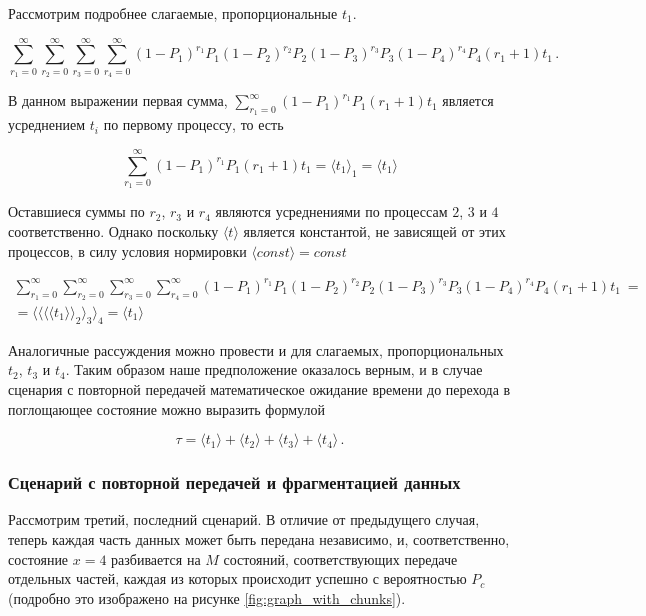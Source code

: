 \documentclass[12pt]{article}
\theoremstyle{definition}
\begin{document}
Рассмотрим подробнее слагаемые, пропорциональные $t_1$.

\begin{equation}
\sum_{r_1=0}^\infty\sum_{r_2=0}^\infty\sum_{r_3=0}^\infty\sum_{r_4=0}^\infty (1-P_1)^{r_1}P_1 (1-P_2)^{r_2}P_2 (1-P_3)^{r_3}P_3 (1-P_4)^{r_4}P_4 (r_1+1)t_1\,.
\end{equation}

В данном выражении первая сумма, $\sum_{r_1=0}^\infty (1-P_1)^{r_1}P_1 (r_1+1)t_1$ является усреднением $t_i$ по первому процессу, то есть 

\begin{equation}
    \sum_{r_1=0}^\infty (1-P_1)^{r_1}P_1 (r_1+1)t_1 = \langle t_1 \rangle_1 = \langle t_1 \rangle
\end{equation}

Оставшиеся суммы по $r_2$, $r_3$ и $r_4$ являются усреднениями по процессам $2$, $3$ и $4$ соответственно. Однако поскольку $\langle t\rangle$ является константой, не зависящей от этих процессов, в силу условия нормировки $\langle const\rangle = const$

\begin{multline}
\sum_{r_1=0}^\infty\sum_{r_2=0}^\infty\sum_{r_3=0}^\infty\sum_{r_4=0}^\infty (1-P_1)^{r_1}P_1 (1-P_2)^{r_2}P_2 (1-P_3)^{r_3}P_3 (1-P_4)^{r_4}P_4 (r_1+1)t_1\ = \\
= \langle\langle\langle\langle t_1 \rangle\rangle_2\rangle_3\rangle_4 = \langle t_1 \rangle
\end{multline}

Аналогичные рассуждения можно провести и для слагаемых, пропорциональных $t_2$, $t_3$ и $t_4$. Таким образом наше предположение оказалось верным, и в случае сценария с повторной передачей математическое ожидание времени до перехода в поглощающее состояние можно выразить формулой

\begin{equation}
\label{w_repeat}
    \tau = \langle t_1\rangle + \langle t_2\rangle + \langle t_3\rangle + \langle t_4\rangle\,.
\end{equation}

\subsubsection{Сценарий с повторной передачей и фрагментацией данных}

Рассмотрим третий, последний сценарий. В отличие от предыдущего случая, теперь каждая часть данных может быть передана независимо, и, соответственно, состояние $x=4$ разбивается на $M$ состояний, соответствующих передаче отдельных частей, каждая из которых происходит успешно с вероятностью $P_c$ (подробно это изображено на рисунке \ref{fig:graph_with_chunks}). 
\end{document}

